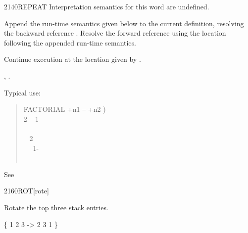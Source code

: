 \begin{worddef}{2140}{REPEAT}
\interpret
	Interpretation semantics for this word are undefined.

\compile

	Append the run-time semantics given below to the current
	definition, resolving the backward reference .
	Resolve the forward reference  using the location
	following the appended run-time semantics.

\runtime
	\stack{}{}

	Continue execution at the location given by .

\see {},
	.

	\begin{defer}
	\rationale %
		Typical use:
		\begin{quote}\ttfamily
			\word{:} FACTORIAL  +n1 -- +n2 ) \\
			\tab {} 2  ~
				 1 ~  \\
			\tab {} \\
			\tab {}~  2   \\
			\tab~~ 1- ~  \word{*}~  \\
			\tab {}  \\
			\word{;}
		\end{quote}

	\testing\rmfamily
		See 
	\end{defer}
\end{worddef}


\begin{worddef}{2160}{ROT}[rote]
\item {}

	Rotate the top three stack entries.

	\begin{defer}
	\testing
		\{ 1 2 3  -> 2 3 1 \}
	\end{defer}
\end{worddef}



